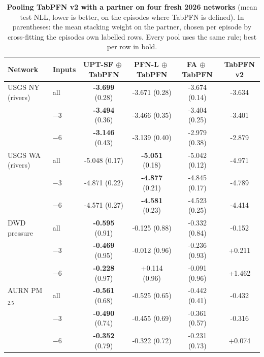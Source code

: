 \begin{table}[t]\centering\small
\caption{\textbf{Pooling TabPFN v2 with a partner on four fresh 2026 networks} (mean test NLL, lower is better, on the episodes where TabPFN is defined). In parentheses: the mean stacking weight on the partner, chosen per episode by cross-fitting the episode\textquotesingle s own labelled rows. Every pool uses the same rule; best per row in bold.}
\label{tab:pool}
\setlength{\tabcolsep}{3.5pt}
\begin{tabular}{llcccc}
\toprule
Network & Inputs & UPT-SF$\,\oplus\,$TabPFN & PFN-L$\,\oplus\,$TabPFN & FA$\,\oplus\,$TabPFN & TabPFN v2 \\
\midrule
USGS NY (rivers) & all & \textbf{-3.699} (0.28) & -3.671 (0.28) & -3.674 (0.14) & -3.634 \\
 & $-3$ & \textbf{-3.494} (0.36) & -3.466 (0.35) & -3.404 (0.25) & -3.401 \\
 & $-6$ & \textbf{-3.146} (0.43) & -3.139 (0.40) & -2.979 (0.38) & -2.879 \\
\addlinespace
USGS WA (rivers) & all & -5.048 (0.17) & \textbf{-5.051} (0.18) & -5.042 (0.12) & -4.971 \\
 & $-3$ & -4.871 (0.22) & \textbf{-4.877} (0.21) & -4.845 (0.17) & -4.789 \\
 & $-6$ & -4.571 (0.27) & \textbf{-4.581} (0.23) & -4.523 (0.25) & -4.414 \\
\addlinespace
DWD pressure & all & \textbf{-0.595} (0.91) & -0.125 (0.88) & -0.332 (0.84) & -0.152 \\
 & $-3$ & \textbf{-0.469} (0.95) & -0.012 (0.96) & -0.236 (0.93) & +0.211 \\
 & $-6$ & \textbf{-0.228} (0.97) & +0.114 (0.96) & -0.091 (0.96) & +1.462 \\
\addlinespace
AURN PM$_{2.5}$ & all & \textbf{-0.561} (0.68) & -0.525 (0.65) & -0.442 (0.41) & -0.432 \\
 & $-3$ & \textbf{-0.490} (0.74) & -0.455 (0.69) & -0.361 (0.57) & -0.316 \\
 & $-6$ & \textbf{-0.352} (0.79) & -0.322 (0.72) & -0.231 (0.73) & +0.074 \\
\bottomrule
\end{tabular}
\end{table}
